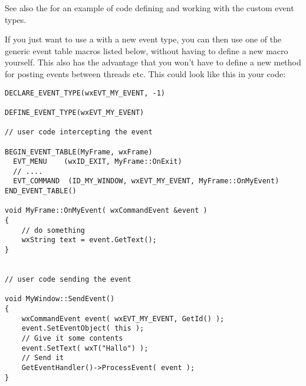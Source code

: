 See also the  for an example of code
defining and working with the custom event types.


If you just want to use a  with
a new event type, you can then use one of the generic event table macros
listed below, without having to define a new macro yourself. This also
has the advantage that you won't have to define a new 
method for posting events between threads etc. This could look like this
in your code:

{\small%
\begin{verbatim}
DECLARE_EVENT_TYPE(wxEVT_MY_EVENT, -1)

DEFINE_EVENT_TYPE(wxEVT_MY_EVENT)

// user code intercepting the event

BEGIN_EVENT_TABLE(MyFrame, wxFrame)
  EVT_MENU    (wxID_EXIT, MyFrame::OnExit)
  // ....
  EVT_COMMAND  (ID_MY_WINDOW, wxEVT_MY_EVENT, MyFrame::OnMyEvent)
END_EVENT_TABLE()

void MyFrame::OnMyEvent( wxCommandEvent &event )
{
    // do something
    wxString text = event.GetText();
}


// user code sending the event

void MyWindow::SendEvent()
{
    wxCommandEvent event( wxEVT_MY_EVENT, GetId() );
    event.SetEventObject( this );
    // Give it some contents
    event.SetText( wxT("Hallo") );
    // Send it
    GetEventHandler()->ProcessEvent( event );
}
\end{verbatim}
}%



\twocolwidtha{8cm}%
\begin{twocollist}\itemsep=0pt
\end{twocollist}


